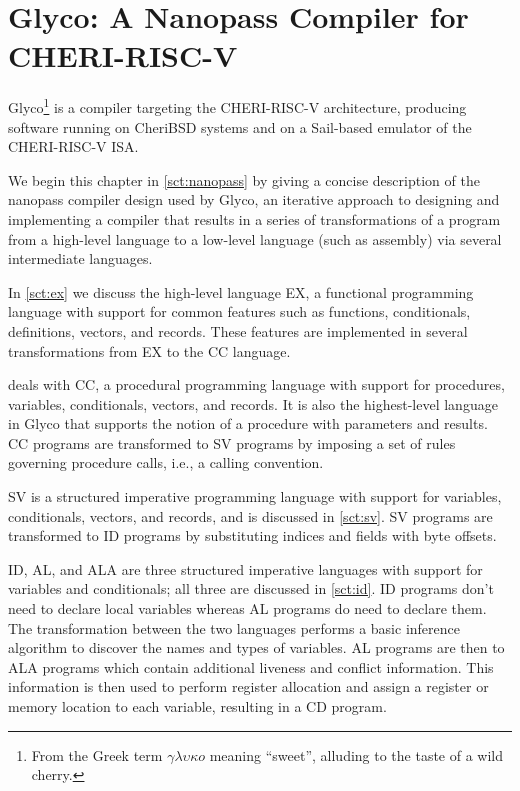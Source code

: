 \documentclass[main.tex]{subfiles}
\begin{document}
\onlyinsubfile{\mainmatter{}}

\chapter{Glyco: A Nanopass Compiler for CHERI-RISC-V}
Glyco\footnote{From the Greek term $\gamma\lambda\upsilon\kappa{}o$ meaning \enquote{sweet}, alluding to the taste of a wild cherry.} is a compiler targeting the CHERI-RISC-V architecture, producing software running on CheriBSD systems and on a Sail-based emulator of the CHERI-RISC-V ISA.

We begin this chapter in \cref{sct:nanopass} by giving a concise description of the nanopass compiler design used by Glyco, an iterative approach to designing and implementing a compiler that results in a series of transformations of a program from a high-level language to a low-level language (such as assembly) via several intermediate languages.

In \cref{sct:ex} we discuss the high-level language EX, a functional programming language with support for common features such as functions, conditionals, definitions, vectors, and records. These features are implemented in several transformations from EX to the CC language.

 deals with CC, a procedural programming language with support for procedures, variables, conditionals, vectors, and records. It is also the highest-level language in Glyco that supports the notion of a procedure with parameters and results. CC programs are transformed to SV programs by imposing a set of rules governing procedure calls, i.e., a calling convention.

SV is a structured imperative programming language with support for variables, conditionals, vectors, and records, and is discussed in \cref{sct:sv}. SV programs are transformed to ID programs by substituting indices and fields with byte offsets.

ID, AL, and ALA are three structured imperative languages with support for variables and conditionals; all three are discussed in \cref{sct:id}. ID programs don't need to declare local variables whereas AL programs do need to declare them. The transformation between the two languages performs a basic inference algorithm to discover the names and types of variables. AL programs are then \lowered{} to ALA programs which contain additional liveness and conflict information. This information is then used to perform register allocation and assign a register or memory location to each variable, resulting in a CD program.
\end{document}
